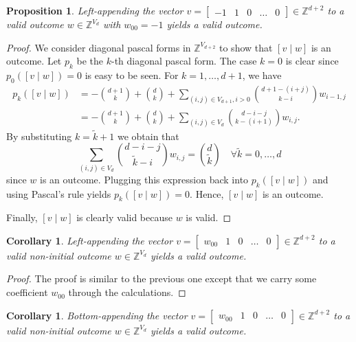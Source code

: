 \documentclass[11pt]{article}
\newtheorem{proposition}[theorem]{Proposition}
\newtheorem{corollary}[theorem]{Corollary}
\begin{document}
\begin{proposition}
  Left-appending the vector $v = \begin{bmatrix} -1 & 1 & 0 & \dots & 0 \end{bmatrix}\in \mathbb{Z}^{d + 2}$ to a valid outcome $w \in \mathbb{Z}^{V_{d}}$ with $w_{00} = -1$ yields a valid outcome. 
\end{proposition}

\begin{proof}
  We consider diagonal pascal forms in $\mathbb{Z}^{V_{d + 2}}$ to show that $[v \mid w]$ is an outcome. Let $p_{k}$ be the $k$-th diagonal pascal form. The case $k = 0$ is clear since $p_{0}([v \mid w]) = 0$ is easy to be seen. For $k = 1, \dots, d + 1$, we have
  \begin{align*}
    p_{k}([v \mid w]) &= - {d + 1 \choose k} + {d  \choose k} + \sum_{(i,j) \in V_{d + 1}, i > 0} {d + 1 - (i + j) \choose k - i}  w_{i - 1,j}  \\
                        &= - {d + 1 \choose k} + {d \choose k} + \sum_{(i,j) \in V_{d}}  {d - i - j \choose k - (i + 1)} w_{i,j} .
  \end{align*}
  By substituting $k = \tilde k + 1$ we obtain that
  \[
    \sum_{(i,j) \in V_{d}}  {d - i - j \choose \tilde k - i}  w_{i,j}  = 
     {d \choose \tilde k} \quad \forall \tilde k = 0, \dots, d
  \]
  since $w$ is an outcome. Plugging this expression back into $p_{k}([v \mid w])$ and using Pascal's rule yields $p_{k}([v \mid w]) = 0$. Hence, $[v \mid w]$ is an outcome.

  Finally, $[v \mid w]$ is clearly valid because $w$ is valid.
\end{proof}

\begin{corollary}
  Left-appending the vector $v = \begin{bmatrix} w_{00} & 1 & 0 & \dots & 0  \end{bmatrix}\in \mathbb{Z}^{d + 2}$ to a valid non-initial outcome $w \in \mathbb{Z}^{V_{d}}$ yields a valid outcome. 
\end{corollary}

\begin{proof}
  The proof is similar to the previous one except that we carry some coefficient $w_{00}$ through the calculations.
\end{proof}

\begin{corollary}
  Bottom-appending the vector $v = \begin{bmatrix} w_{00} & 1 & 0 & \dots & 0  \end{bmatrix}\in \mathbb{Z}^{d + 2}$ to a valid non-initial outcome $w \in \mathbb{Z}^{V_{d}}$ yields a valid outcome. 
\end{corollary}
\end{document}
